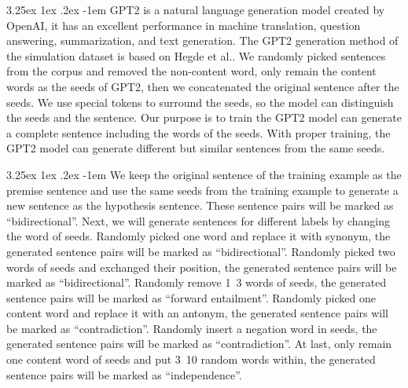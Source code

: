 \documentclass[12pt]{article}
\makeatletter
\renewcommand\paragraph{\@startsection{paragraph}{5}{\z@}%
  {3.25ex \@plus1ex \@minus.2ex}%
  {-1em}%
  {\normalfont\normalsize\bfseries}}
\makeatother
\begin{document}
\begin{CJK*}{UTF8}{bkai}
\begin{spacing}{1.77}
\paragraph{}
GPT2\cite{radford2019language} is a natural language generation model created by OpenAI, it has an excellent performance in machine translation, question answering, summarization, and text generation. The GPT2 generation method of the simulation dataset is based on Hegde et al.\cite{hegde2020unsupervised}. We randomly picked sentences from the corpus and removed the non-content word, only remain the content words as the seeds of GPT2, then we concatenated the original sentence after the seeds. We use special tokens to surround the seeds, so the model can distinguish the seeds and the sentence. Our purpose is to train the GPT2 model can generate a complete sentence including the words of the seeds. With proper training, the GPT2 model can generate different but similar sentences from the same seeds.

\paragraph{}
We keep the original sentence of the training example as the premise sentence and use the same seeds from the training example to generate a new sentence as the hypothesis sentence. These sentence pairs will be marked as ``bidirectional''. Next, we will generate sentences for different labels by changing the word of seeds. Randomly picked one word and replace it with synonym, the generated sentence pairs will be marked as ``bidirectional''. Randomly picked two words of seeds and exchanged their position, the generated sentence pairs will be marked as ``bidirectional''. Randomly remove 1~3 words of seeds, the generated sentence pairs will be marked as ``forward entailment''. Randomly picked one content word and replace it with an antonym, the generated sentence pairs will be marked as ``contradiction''. Randomly insert a negation word in seeds, the generated sentence pairs will be marked as ``contradiction''. At last, only remain one content word of seeds and put 3~10 random words within, the generated sentence pairs will be marked as ``independence''.


\end{spacing}
\end{CJK*}
\end{document}
